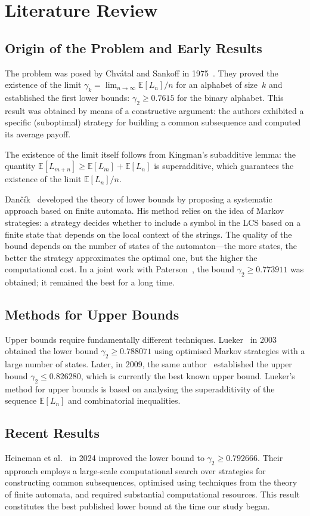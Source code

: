 \documentclass[12pt,a4paper]{article}
\begin{document}
\section{Literature Review}
\subsection{Origin of the Problem and Early Results}
The problem was posed by Chv\'{a}tal and Sankoff in 1975~\cite{chvatal1975}.
They proved the existence of the limit $\gamma_k = \lim_{n \to \infty} \mathbb{E}[L_n]/n$ for an alphabet of size~$k$ and established the first lower bounds: $\gamma_2 \geq 0.7615$ for the binary alphabet.
This result was obtained by means of a constructive argument: the authors exhibited a specific (suboptimal) strategy for building a common subsequence and computed its average payoff.

The existence of the limit itself follows from Kingman's subadditive lemma: the quantity $\mathbb{E}[L_{m+n}] \geq \mathbb{E}[L_m] + \mathbb{E}[L_n]$ is superadditive, which guarantees the existence of the limit $\mathbb{E}[L_n]/n$.

Dan\v{c}\'{i}k~\cite{dancik1994} developed the theory of lower bounds by proposing a systematic approach based on finite automata.
His method relies on the idea of Markov strategies: a strategy decides whether to include a symbol in the LCS based on a finite state that depends on the local context of the strings.
The quality of the bound depends on the number of states of the automaton---the more states, the better the strategy approximates the optimal one, but the higher the computational cost.
In a joint work with Paterson~\cite{dancik1995}, the bound $\gamma_2 \geq 0.773911$ was obtained; it remained the best for a long time.

\subsection{Methods for Upper Bounds}
Upper bounds require fundamentally different techniques.
Lueker~\cite{lueker2003} in 2003 obtained the lower bound $\gamma_2 \geq 0.788071$ using optimised Markov strategies with a large number of states.
Later, in 2009, the same author~\cite{lueker2009} established the upper bound $\gamma_2 \leq 0.826280$, which is currently the best known upper bound.
Lueker's method for upper bounds is based on analysing the superadditivity of the sequence $\mathbb{E}[L_n]$ and combinatorial inequalities.

\subsection{Recent Results}
Heineman et al.~\cite{heineman2024} in 2024 improved the lower bound to $\gamma_2 \geq 0.792666$.
Their approach employs a large-scale computational search over strategies for constructing common subsequences, optimised using techniques from the theory of finite automata, and required substantial computational resources.
This result constitutes the best published lower bound at the time our study began.
\end{document}
